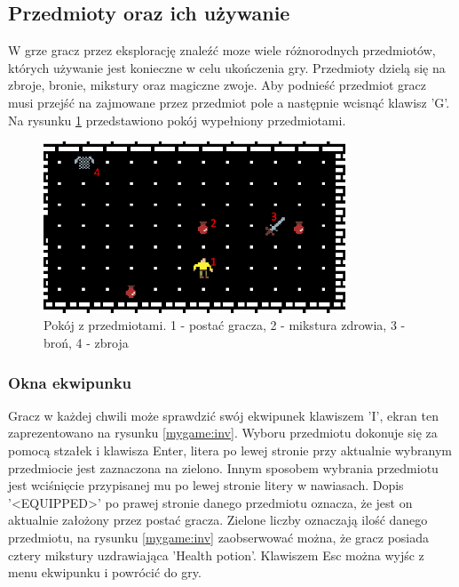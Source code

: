 \documentclass[12pt,twoside]{article}
\begin{document}
\subsection{Przedmioty oraz ich używanie}
W grze gracz przez eksplorację znaleźć moze wiele różnorodnych przedmiotów, których używanie jest konieczne w celu ukończenia gry. Przedmioty dzielą się na zbroje, bronie, mikstury oraz magiczne zwoje. Aby podnieść przedmiot gracz musi przejść na zajmowane przez przedmiot pole a następnie wcisnąć klawisz 'G'. Na rysunku \ref{mygame:item_room} przedstawiono pokój wypełniony przedmiotami.

\FloatBarrier
\begin{figure}[h]
	\centering
	\includegraphics[width=9cm]{images/mygame/item_room.png}
	\caption{Pokój z przedmiotami. 1 - postać gracza, 2 - mikstura zdrowia, 3 - broń, 4 - zbroja }
	\label{mygame:item_room}
\end{figure}
\FloatBarrier


\subsubsection{Okna ekwipunku}
Gracz w każdej chwili może sprawdzić swój ekwipunek klawiszem 'I', ekran ten zaprezentowano na rysunku \ref{mygame:inv}. Wyboru przedmiotu dokonuje się za pomocą stzałek i klawisza Enter, litera po lewej stronie przy aktualnie wybranym przedmiocie jest zaznaczona na zielono. Innym sposobem wybrania przedmiotu jest wciśnięcie przypisanej mu po lewej stronie litery w nawiasach. Dopis '<EQUIPPED>' po prawej stronie danego przedmiotu oznacza, że jest on aktualnie założony przez postać gracza. Zielone liczby oznaczają ilość danego przedmiotu, na rysunku \ref{mygame:inv} zaobserwować można, że gracz posiada cztery mikstury uzdrawiająca 'Health potion'. Klawiszem Esc można wyjśc z menu ekwipunku i powrócić do gry.
\end{document}

